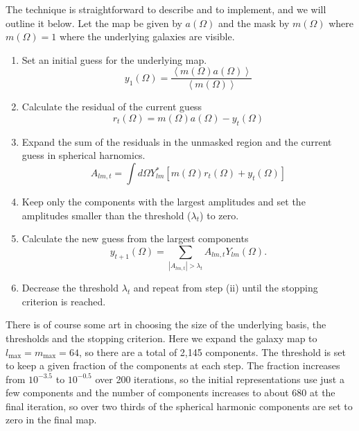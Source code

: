 \documentclass[useAMS,usenatbib]{mn2e}
\begin{document}
The technique is straightforward to describe and to implement, and we
will outline it below.  Let the map be given by $a(\Omega)$ and the
mask by $m(\Omega)$ where $m(\Omega)=1$ where the underlying galaxies
are visible.
\begin{enumerate}
\item
  Set an initial guess for the underlying map.
\begin{equation}
  y_1(\Omega) = \frac{\left \langle  m(\Omega) a(\Omega)  \right \rangle}{\left \langle m(\Omega) \right \rangle }
    \label{eq:2}
\end{equation}
\item
  Calculate the residual of the current guess
  \begin{equation}
    r_t(\Omega) =  m(\Omega) a(\Omega) - y_t(\Omega)
    \label{eq:3}
  \end{equation}
\item
  Expand the sum of the residuals in the unmasked region and the current guess
  in spherical harnomics.
  \begin{equation}
    A_{lm,t} = \int d\Omega Y^*_{lm} \left [ m(\Omega) r_t(\Omega) + y_t(\Omega) \right ]
    \label{eq:4}
  \end{equation}
\item
  Keep only the components with the largest amplitudes and set the
  amplitudes smaller than the threshold ($\lambda_t$) to zero.
\item
  Calculate the new guess from the largest components
  \begin{equation}
    y_{t+1}(\Omega) = \sum_{|A_{lm,t}| > \lambda_t} A_{lm,t} Y_{lm}(\Omega).
    \label{eq:5}
  \end{equation}
\item
  Decrease the threshold $\lambda_t$ and repeat from step (ii) until the stopping criterion
  is reached.
\end{enumerate}
There is of course some art in choosing the size of the underlying
basis, the thresholds and the stopping criterion.  Here we expand the
galaxy map to $l_\mathrm{max}=m_\mathrm{max}=64$, so there are a total
of 2,145 components.  The threshold is set to keep a given fraction of
the components at each step.  The fraction increases from $10^{-3.5}$
to $10^{-0.5}$ over 200 iterations, so the initial representations use
just a few components and the number of components increases to about
680 at the final iteration, so over two thirds of the spherical
harmonic components are set to zero in the final map.
\end{document}
